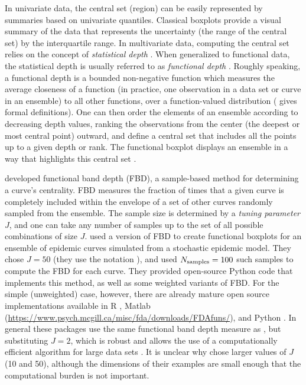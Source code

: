 \documentclass[fleqn,10pt,lineno]{wlpeerj}
\begin{document}
In univariate data, the central set (region) can be easily represented by summaries based on univariate quantiles. Classical boxplots provide a visual summary of the data that represents the uncertainty (the range of the central set) by the interquartile range. In multivariate data, computing the central set relies on the concept of \emph{statistical depth} \citep{mahalanobis1936generalized, tukey1975mathematics, oja1983descriptive, liu1990notion, singh1991notion, vardi2000multivariate, zuo2003projection}. When generalized to functional data, the statistical depth is usually referred to as \emph{functional depth} \citep{fraiman2001trimmed}.
Roughly speaking, a functional depth is a bounded non-negative function which measures the average closeness of a function (in practice, one observation in a data set or curve in an ensemble) to all other functions, over a function-valued distribution (\cite{zuo2000general} gives formal definitions). 
One can then order the elements of an ensemble according to decreasing depth values, ranking the observations from the center (the deepest or most central point) outward, and define a central set that includes all the points up to a given depth or rank. The functional boxplot displays an ensemble in a way that highlights this central set \citep{sun2011functional,sun2012exact}.

 \cite{lopez2007depth} developed functional band depth (FBD), a sample-based method for determining a curve's centrality. FBD measures the fraction of times that a given curve is completely included within the envelope of a set of other curves randomly sampled from the ensemble. The sample size is determined by a \emph{tuning parameter} $J$, and one can take any number of samples up to the set of all possible combinations of size $J$. \juul used a version of FBD to create functional boxplots for an ensemble of epidemic curves simulated from a stochastic epidemic model. They chose $J=50$ (they use the notation \ncurve), and used $N_{\textrm{samples}}=100$ such samples to compute the FBD for each curve. They provided open-source Python code that implements this method, as well as some weighted variants of FBD. For the simple (unweighted) case, however, there are already mature open source implementations available in R \citep{fda_pkg,roahd}, Matlab (\url{https://www.psych.mcgill.ca/misc/fda/downloads/FDAfuns/}), and Python \citep{seabold2010statsmodels}. In general these packages use the same functional band depth measure as \juul, but substituting $J=2$, which is robust \citep{lopez2009concept} and allows the use of a computationally efficient algorithm for large data sets \citep{sun2012exact}. It is unclear why \juul chose larger values of $J$ (10 and 50), although the dimensions of their examples are small enough that the computational burden is not important.
\end{document}
